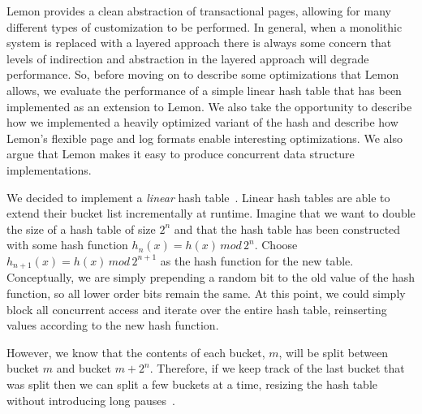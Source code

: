 \documentclass[10pt,letterpaper,twocolumn,english]{article}
\newcommand{\yad}{Lemon\xspace}
\begin{document}
\yad provides a clean abstraction of transactional pages, allowing for 
many different types of customization to be performed.  In general, when 
a monolithic system is replaced with a layered approach there is always
some concern that levels of indirection and abstraction in the layered 
approach will degrade performance.  So, before 
moving on to describe some optimizations that \yad allows, we evaluate 
the performance of a simple linear hash table that has been implemented as an 
extension to \yad.  We also take the opportunity to describe how we
implemented a heavily optimized variant of the hash and
describe how \yad's flexible page and log formats enable interesting
optimizations.  We also argue that \yad makes it easy to produce
concurrent data structure implementations.



We decided to implement a {\em linear} hash table~\cite{lht}.  Linear
hash tables are able to extend their bucket list
incrementally at runtime. Imagine that we want
to double the size of a hash table of size $2^{n}$ and that the hash
table has been constructed with some hash function $h_{n}(x)=h(x)\,
mod\,2^{n}$.  Choose $h_{n+1}(x)=h(x)\, mod\,2^{n+1}$ as the hash
function for the new table. Conceptually, we are simply prepending a
random bit to the old value of the hash function, so all lower order
bits remain the same. At this point, we could simply block all
concurrent access and iterate over the entire hash table, reinserting
values according to the new hash function.

However, 
we know that the contents of each bucket, $m$, will be split between
bucket $m$ and bucket $m+2^{n}$. Therefore, if we keep track of the
last bucket that was split then we can split a few buckets at a time,
resizing the hash table without introducing long pauses~\cite{lht}.
\end{document}
